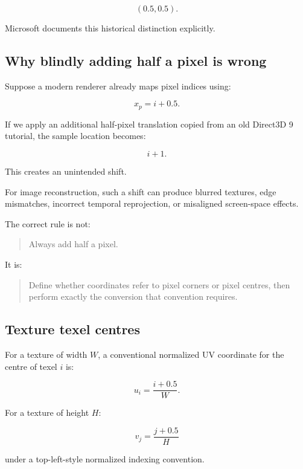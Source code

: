 \[
 \boxed{(0.5,0.5)}.
\]

Microsoft documents this historical distinction explicitly. 

\subsection{Why blindly adding half a pixel is wrong}\label{02-foundations-ii-ch033-why-blindly-adding-half-a-pixel-is-wrong}

\hypertarget{02-foundations-ii-ch033-why-blindly-adding-half-a-pixel-is-wrong}{}

Suppose a modern renderer already maps pixel indices using:

\[
 x_p=i+0.5.
\]

If we apply an additional half-pixel translation copied from an old Direct3D 9 tutorial, the sample location becomes:

\[
 i+1.
\]

This creates an unintended shift.

For image reconstruction, such a shift can produce blurred textures, edge mismatches, incorrect temporal reprojection, or misaligned screen-space effects.

The correct rule is not:

\begin{quote}
Always add half a pixel.
\end{quote}

It is:

\begin{quote}
Define whether coordinates refer to pixel corners or pixel centres, then perform exactly the conversion that convention requires.
\end{quote}

\subsection{Texture texel centres}\label{02-foundations-ii-ch033-texture-texel-centres}

\hypertarget{02-foundations-ii-ch033-texture-texel-centres}{}

For a texture of width \(W\), a conventional normalized UV coordinate for the centre of texel \(i\) is:

\[
 \boxed{ u_i=\frac{i+0.5}{W} }.
\]

For a texture of height \(H\):

\[
 \boxed{ v_j=\frac{j+0.5}{H} }
\]

under a top-left-style normalized indexing convention.

